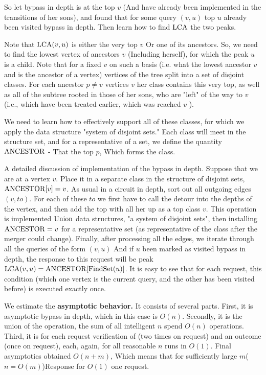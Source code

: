 So let bypass in depth is at the top $v$ (And have already been implemented in the transitions of her sons), and found that for some query $(v, u)$ top $u$ already been visited bypass in depth. Then learn how to find $\rm LCA$ the two peaks.

Note that ${\rm LCA} (v, u)$ is either the very top $v$ Or one of its ancestors. So, we need to find the lowest vertex of ancestors $v$ (Including herself), for which the peak $u$ is a child. Note that for a fixed $v$ on such a basis (i.e. what the lowest ancestor $v$ and is the ancestor of a vertex) vertices of the tree split into a set of disjoint classes. For each ancestor $p \not = v$ vertices $v$ her class contains this very top, as well as all of the subtree rooted in those of her sons, who are "left" of the way to $v$ (i.e., which have been treated earlier, which was reached $v$ ).

We need to learn how to effectively support all of these classes, for which we apply the data structure "system of disjoint sets." Each class will meet in the structure set, and for a representative of a set, we define the quantity $\rm ANCESTOR$ - That the top $p$, Which forms the class.

A detailed discussion of implementation of the bypass in depth. Suppose that we are at a vertex $v$. Place it in a separate class in the structure of disjoint sets, ${\rm ANCESTOR} [v] = v$. As usual in a circuit in depth, sort out all outgoing edges $(v, to)$. For each of these $to$ we first have to call the detour into the depths of the vertex, and then add the top with all her up as a top class $v$. This operation is implemented $\rm Union$ data structures, "a system of disjoint sets", then installing ${\rm ANCESTOR} = v$ for a representative set (as representative of the class after the merger could change). Finally, after processing all the edges, we iterate through all the queries of the form $(v, u)$ And if $u$ been marked as visited bypass in depth, the response to this request will be peak ${\rm LCA} (v, u) = {\rm ANCESTOR} [{\rm FindSet} (u)]$. It is easy to see that for each request, this condition (which one vertex is the current query, and the other has been visited before) is executed exactly once.

We estimate the \textbf{asymptotic behavior.} It consists of several parts. First, it is asymptotic bypass in depth, which in this case is $O (n)$. Secondly, it is the union of the operation, the sum of all intelligent $n$ spend $O (n)$ operations. Third, it is for each request verification of (two times on request) and an outcome (once on request), each, again, for all reasonable $n$ runs in $O (1)$. Final asymptotics obtained $O (n + m)$, Which means that for sufficiently large $m$($n = O (m)$)Response for $O (1)$ one request.


